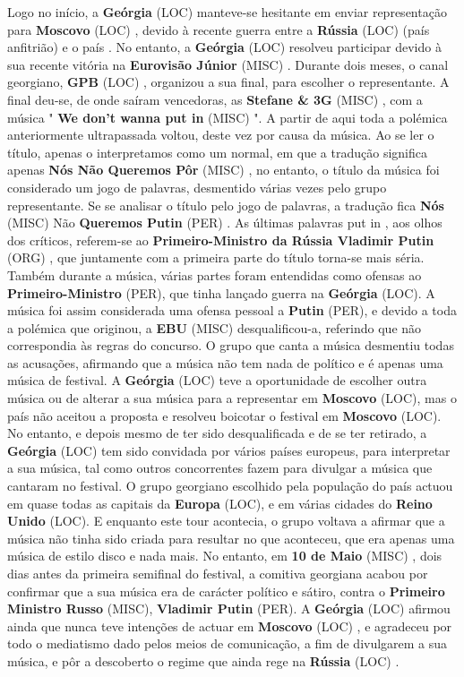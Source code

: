 \documentclass[12pt,a4paper]{article}
\begin{document}
Logo no início, a \textbf{Geórgia} (LOC) manteve-se hesitante em enviar representação para \textbf{Moscovo} (LOC) , devido à recente guerra entre a \textbf{Rússia} (LOC) (país anfitrião) e o país . No entanto, a \textbf{Geórgia} (LOC) resolveu participar devido à sua recente vitória na \textbf{Eurovisão Júnior} (MISC) . Durante dois meses, o canal georgiano, \textbf{GPB} (LOC) , organizou a sua final, para escolher o representante. A final deu-se, de onde saíram vencedoras, as \textbf{Stefane \& 3G} (MISC) , com a música " \textbf{We don't wanna put in} (MISC) ". A partir de aqui toda a polémica anteriormente ultrapassada voltou, deste vez por causa da música. Ao se ler o título, apenas o interpretamos como um normal, em que a tradução significa apenas \textbf{Nós Não Queremos Pôr} (MISC) , no entanto, o título da música foi considerado um jogo de palavras, desmentido várias vezes pelo grupo representante. Se se analisar o título pelo jogo de palavras, a tradução fica \textbf{Nós} (MISC) Não \textbf{Queremos Putin} (PER) . As últimas palavras put in , aos olhos dos críticos, referem-se ao \textbf{Primeiro-Ministro da Rússia Vladimir Putin} (ORG) , que juntamente com a primeira parte do título torna-se mais séria. Também durante a música, várias partes foram entendidas como ofensas ao \textbf{Primeiro-Ministro} (PER), que tinha lançado guerra na \textbf{Geórgia} (LOC). A música foi assim considerada uma ofensa pessoal a \textbf{Putin} (PER), e devido a toda a polémica que originou, a \textbf{EBU} (MISC) desqualificou-a, referindo que não correspondia às regras do concurso. O grupo que canta a música desmentiu todas as acusações, afirmando que a música não tem nada de político e é apenas uma música de festival. A \textbf{Geórgia} (LOC) teve a oportunidade de escolher outra música ou de alterar a sua música para a representar em \textbf{Moscovo} (LOC), mas o país não aceitou a proposta e resolveu boicotar o festival em \textbf{Moscovo} (LOC). No entanto, e depois mesmo de ter sido desqualificada e de se ter retirado, a \textbf{Geórgia} (LOC) tem sido convidada por vários países europeus, para interpretar a sua música, tal como outros concorrentes fazem para divulgar a música que cantaram no festival. O grupo georgiano escolhido pela população do país actuou em quase todas as capitais da \textbf{Europa} (LOC), e em várias cidades do \textbf{Reino Unido} (LOC). E enquanto este tour acontecia, o grupo voltava a afirmar que a música não tinha sido criada para resultar no que aconteceu, que era apenas uma música de estilo disco e nada mais. No entanto, em \textbf{10 de Maio} (MISC) , dois dias antes da primeira semifinal do festival, a comitiva georgiana acabou por confirmar que a sua música era de carácter político e sátiro, contra o \textbf{Primeiro Ministro Russo} (MISC), \textbf{Vladimir Putin} (PER). A \textbf{Geórgia} (LOC) afirmou ainda que nunca teve intenções de actuar em \textbf{Moscovo} (LOC) , e agradeceu por todo o mediatismo dado pelos meios de comunicação, a fim de divulgarem a sua música, e pôr a descoberto o regime que ainda rege na \textbf{Rússia} (LOC) .
\end{document}
